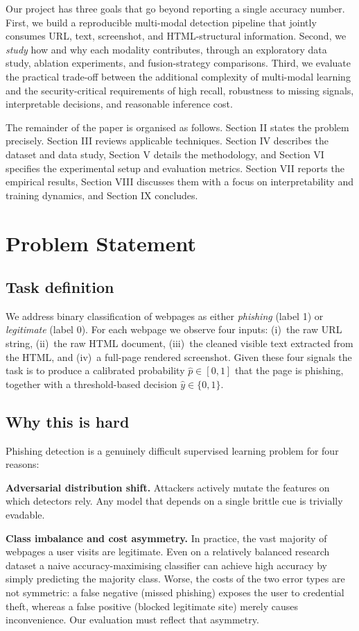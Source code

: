 \documentclass[conference]{IEEEtran}
\begin{document}
Our project has three goals that go beyond reporting a single
accuracy number. First, we build a reproducible multi-modal
detection pipeline that jointly consumes URL, text, screenshot, and
HTML-structural information. Second, we \emph{study} how and why
each modality contributes, through an exploratory data study,
ablation experiments, and fusion-strategy comparisons. Third, we
evaluate the practical trade-off between the additional complexity
of multi-modal learning and the security-critical requirements of
high recall, robustness to missing signals, interpretable
decisions, and reasonable inference cost.

The remainder of the paper is organised as follows. Section II
states the problem precisely. Section III reviews applicable
techniques. Section IV describes the dataset and data study,
Section V details the methodology, and Section VI specifies the
experimental setup and evaluation metrics. Section VII reports the
empirical results, Section VIII discusses them with a focus on
interpretability and training dynamics, and Section IX concludes.

\section{Problem Statement}
\subsection{Task definition}
We address binary classification of webpages as either
\emph{phishing} (label 1) or \emph{legitimate} (label 0). For each
webpage we observe four inputs: (i)~the raw URL string, (ii)~the raw
HTML document, (iii)~the cleaned visible text extracted from the
HTML, and (iv)~a full-page rendered screenshot. Given these four
signals the task is to produce a calibrated probability
$\hat{p}\in[0,1]$ that the page is phishing, together with a
threshold-based decision $\hat{y}\in\{0,1\}$.

\subsection{Why this is hard}
Phishing detection is a genuinely difficult supervised learning
problem for four reasons:

\noindent\textbf{Adversarial distribution shift.} Attackers actively
mutate the features on which detectors rely. Any model that depends
on a single brittle cue is trivially evadable.

\noindent\textbf{Class imbalance and cost asymmetry.} In practice,
the vast majority of webpages a user visits are legitimate. Even on
a relatively balanced research dataset a naive accuracy-maximising
classifier can achieve high accuracy by simply predicting the
majority class. Worse, the costs of the two error types are not
symmetric: a false negative (missed phishing) exposes the user to
credential theft, whereas a false positive (blocked legitimate site)
merely causes inconvenience. Our evaluation must reflect that
asymmetry.
\end{document}
